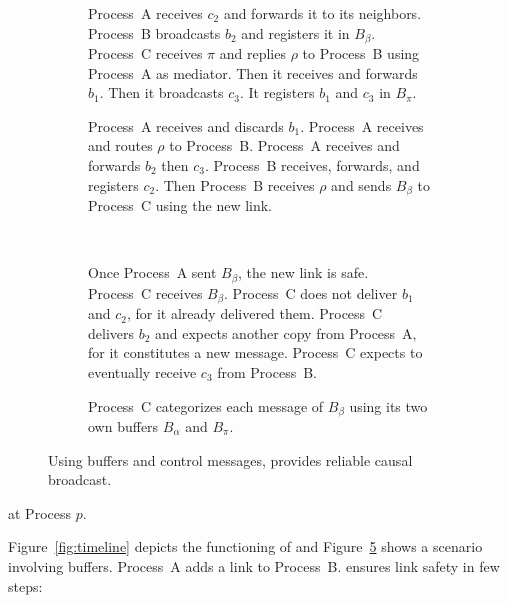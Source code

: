 \begin{figure}
\begin{center}
\begin{subfigure}[t]{0.48\textwidth}
      \centering%
      \caption{\label{fig:solveG}Process~A receives $c_2$ and forwards it to
        its neighbors.  Process~B broadcasts $b_2$ and registers it in
        $B_\beta$. Process~C receives $\pi$ and replies $\rho$ to Process~B
        using Process~A as mediator. Then it receives and forwards $b_1$. Then
        it broadcasts $c_3$. It registers $b_1$ and $c_3$ in $B_\pi$.}
    \end{subfigure}
    \begin{subfigure}[t]{0.48\textwidth}
      \centering%
      \caption{\label{fig:solveH}Process~A receives and discards $b_1$.
        Process~A receives and routes $\rho$ to Process~B.  Process~A receives
        and forwards $b_2$ then $c_3$. Process~B receives, forwards, and
        registers $c_2$. Then Process~B receives $\rho$ and sends $B_\beta$ to
        Process~C using the new link.}
    \end{subfigure}
    ~
    \begin{subfigure}[t]{0.48\textwidth}
      \centering%
      \caption{\label{fig:solveI}Once Process~A sent $B_\beta$, the new link is
        safe.  Process~C receives $B_\beta$. Process~C does not deliver $b_1$
        and $c_2$, for it already delivered them. Process~C delivers $b_2$ and
        expects another copy from Process~A, for it constitutes a new message.
        Process~C expects to eventually receive $c_3$ from Process~B.}
    \end{subfigure}
    \begin{subfigure}[t]{0.99\textwidth}
      \centering%
      \caption{\label{fig:solveJ}Process~C categorizes each message of
        $B_\beta$ using its two own buffers $B_\alpha$ and $B_\pi$.}
    \end{subfigure}
    \caption{\label{fig:solve}Using buffers and control messages, \RPCBROADCAST 
      provides reliable causal broadcast.}
  \end{center}
\end{figure}

\begin{algorithm}[h]
  
  \caption{\label{algo:rpcbroadcast}\RPCBROADCAST at Process $p$.}
\end{algorithm}


Figure~\ref{fig:timeline} depicts the functioning of \RPCBROADCAST and
Figure~\ref{fig:solve} shows a scenario involving buffers.  Process~A adds a link to
Process~B. \RPCBROADCAST ensures link safety in few steps:

